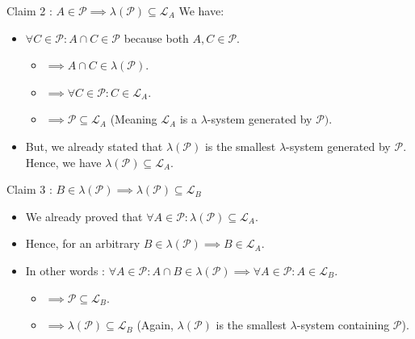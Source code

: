 \begin{proof*}
    \begin{subproof}{Claim 2 : $A\in\mathcal{P}\implies \lambda(\mathcal{P}) \subseteq \mathcal{L}_A$}
        We have:
        \begin{itemize}
    	\item $\forall C \in \mathcal{P}: A\cap C \in \mathcal{P}$ because both $A, C\in\mathcal{P}$.
    		\begin{itemize}[label={}]
                \item $\implies A\cap C \in \lambda(\mathcal{P})$.
        		\item $\implies \forall C\in\mathcal{P} : C\in\mathcal{L}_A$.
        		\item $\implies \mathcal{P}\subseteq \mathcal{L}_A$ (Meaning $\mathcal{L}_A$ is a $\lambda$-system generated  by $\mathcal{P})$.
            \end{itemize}
    	\item But, we already stated that $\lambda(\mathcal{P})$ is the smallest $\lambda$-system generated by $\mathcal{P}$. Hence, we have $\lambda(\mathcal{P})\subseteq\mathcal{L}_A$.\newline
        \end{itemize}
    \end{subproof}

    \begin{subproof}{Claim 3 : $B\in\lambda(\mathcal{P}) \implies \lambda(\mathcal{P}) \subseteq\mathcal{L}_B$}
        \begin{itemize}
            \item We already proved that $\forall A\in\mathcal{P}: \lambda(\mathcal{P})\subseteq \mathcal{L}_A$.
        	\item Hence, for an arbitrary $B\in \lambda(\mathcal{P}) \implies  B \in \mathcal{L}_A$.
        	\item In other words : $\forall A\in \mathcal{P}: A\cap B \in \mathcal{\lambda(\mathcal{P})} \implies \forall A \in \mathcal{P}: A \in \mathcal{L}_B$.
        		\begin{itemize}[label={}]
            		\item $\implies \mathcal{P}\subseteq \mathcal{L}_B$.
            		\item $\implies \lambda(\mathcal{P}) \subseteq \mathcal{L}_B$ (Again, $\lambda(\mathcal{P})$ is the smallest $\lambda$-system containing $\mathcal{P}$).\newline
                \end{itemize}
        \end{itemize}
    \end{subproof}


\end{proof*}
